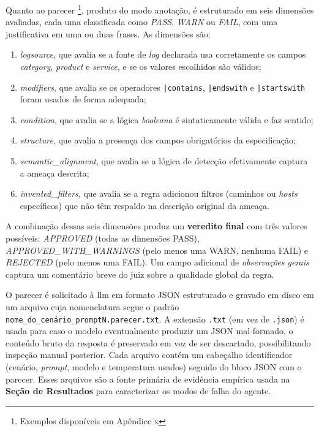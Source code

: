 Quanto ao parecer
\footnote{Exemplos disponíveis em Apêndice x}, 
produto do modo anotação, é estruturado em seis dimensões avaliadas, cada uma classificada como \textit{PASS}, \textit{WARN} ou \textit{FAIL}, com uma justificativa em uma ou duas frases. 
As dimensões são: 
\begin{enumerate}
	\item \textit{logsource}, que avalia se a fonte de \textit{log} declarada usa corretamente os campos \textit{category}, \textit{product} e \textit{service}, e se os valores escolhidos são válidos;
	
	\item \textit{modifiers}, que avalia se os operadores \texttt{|contains}, \texttt{|endswith} e \texttt{|startswith} foram usados de forma adequada;
	
	\item \textit{condition}, que avalia se a lógica \textit{booleana} é sintaticamente válida e faz sentido;
	
	\item \textit{structure}, que avalia a presença dos campos obrigatórios da especificação;
	
	\item \textit{semantic\_alignment}, que avalia se a lógica de detecção efetivamente captura a ameaça descrita;
	
	\item \textit{invented\_filters}, que avalia se a regra adicionou filtros (caminhos ou \textit{hosts} específicos) que não têm respaldo na descrição original da ameaça.
\end{enumerate}
A combinação dessas seis dimensões produz um \textbf{veredito final} com três valores possíveis: \textit{APPROVED} (todas as dimensões PASS), \textit{APPROVED\_WITH\_WARNINGS} (pelo menos uma WARN, nenhuma FAIL) e \textit{REJECTED} (pelo menos uma FAIL). Um campo adicional de \textit{observações gerais} captura um comentário breve do juiz sobre a qualidade global da regra.

O parecer é solicitado à \gls{llm} em formato JSON estruturado e gravado em disco em um arquivo cuja nomenclatura segue o padrão \texttt{\<nome\_do\_cenário\>\_prompt\<N\>.parecer.txt}. A extensão \texttt{.txt} (em vez de \texttt{.json}) é usada para caso o modelo eventualmente produzir um JSON mal-formado, o conteúdo bruto da resposta é preservado em vez de ser descartado, possibilitando inspeção manual posterior. 
Cada arquivo contém um cabeçalho identificador (cenário, \textit{prompt}, modelo e temperatura usados) seguido do bloco JSON com o parecer. 
Esses arquivos são a fonte primária de evidência empírica usada na \textbf{Seção de Resultados} para caracterizar os modos de falha do agente.


